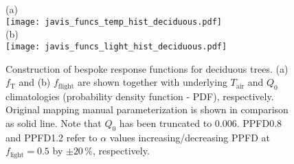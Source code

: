 \documentclass[bg, manuscript]{copernicus}
\begin{document}
\begin{figure}[t]
  \centering
  (a)\\
  \texttt{[image: javis\_funcs\_temp\_hist\_deciduous.pdf]}\\
  (b)\\
  \texttt{[image: javis\_funcs\_light\_hist\_deciduous.pdf]}
\caption{Construction of bespoke response functions for deciduous trees. (a) $f_\mathrm{T}$ and (b) $f_\mathrm{flight}$ are shown together with underlying $T_\mathrm{air}$ and $Q_0$ climatologies (probability density function - PDF), respectively. Original mapping manual parameterization is shown in comparison as solid line. Note that $Q_0$ has been truncated to $0.006$. PPFD0.8 and PPFD1.2 refer to $\alpha$ values increasing/decreasing PPFD at $f_\mathrm{light}=0.5$ by $\pm 20\,\%$, respectively.}
\label{fig:f_temp_birch}
\end{figure}

\clearpage

\noappendix       %








\end{document}
